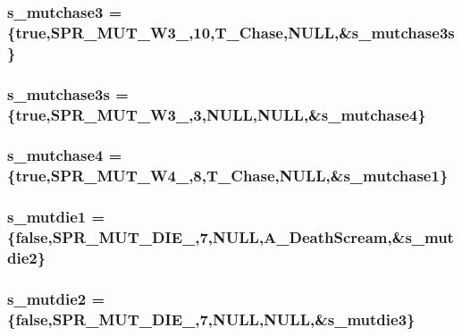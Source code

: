 \label{WL__ACT2_8C_a001bae6f55f368c65e5babfd3469357b}
\hypertarget{WL__ACT2_8C_a06932e0533b7423e4adc7d2adf58e406}{
\subsubsection[{s\_\-mutchase3}]{ {\bf s\_\-mutchase3} = \{true,SPR\_\-MUT\_\-W3\_,10,T\_\-Chase,NULL,\&{\bf s\_\-mutchase3s}\}}}
\label{WL__ACT2_8C_a06932e0533b7423e4adc7d2adf58e406}
\hypertarget{WL__ACT2_8C_a57ee31e6b085b74ed1dc9d5d3fa69acd}{
\subsubsection[{s\_\-mutchase3s}]{ {\bf s\_\-mutchase3s} = \{true,SPR\_\-MUT\_\-W3\_,3,NULL,NULL,\&{\bf s\_\-mutchase4}\}}}
\label{WL__ACT2_8C_a57ee31e6b085b74ed1dc9d5d3fa69acd}
\hypertarget{WL__ACT2_8C_a56eae46ddd14949ac6e994498cf45d02}{
\subsubsection[{s\_\-mutchase4}]{ {\bf s\_\-mutchase4} = \{true,SPR\_\-MUT\_\-W4\_,8,T\_\-Chase,NULL,\&{\bf s\_\-mutchase1}\}}}
\label{WL__ACT2_8C_a56eae46ddd14949ac6e994498cf45d02}
\hypertarget{WL__ACT2_8C_a2af253b4fd1ed084c59d184f2bd6ac9a}{
\subsubsection[{s\_\-mutdie1}]{ {\bf s\_\-mutdie1} = \{false,SPR\_\-MUT\_\-DIE\_,7,NULL,A\_\-DeathScream,\&{\bf s\_\-mutdie2}\}}}
\label{WL__ACT2_8C_a2af253b4fd1ed084c59d184f2bd6ac9a}
\hypertarget{WL__ACT2_8C_a62e3ae61dabb73967fe34eee93e9ca96}{
\subsubsection[{s\_\-mutdie2}]{ {\bf s\_\-mutdie2} = \{false,SPR\_\-MUT\_\-DIE\_,7,NULL,NULL,\&{\bf s\_\-mutdie3}\}}}
